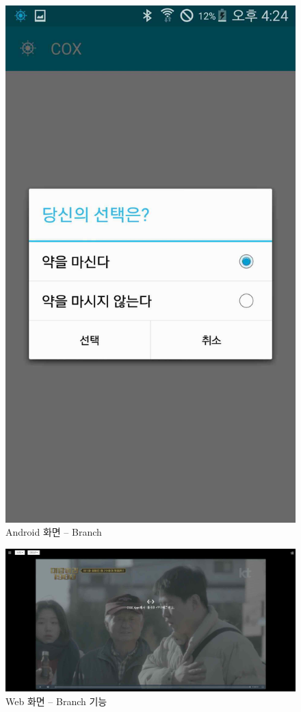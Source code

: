 \documentclass[chapter,oneside]{oblivoir}
\begin{document}
\begin{figure}[h!]
\centering
\includegraphics{pic/chp7/img1004}
\caption{Android 화면 – Branch }
\end{figure}

\begin{figure}[h!]
\centering
\includegraphics{pic/chp7/img1003}
\caption{Web 화면 – Branch 기능}
\end{figure}
\end{document}
